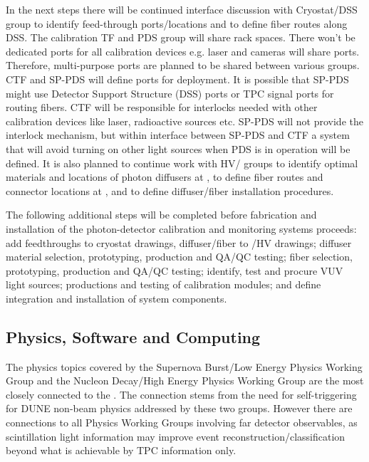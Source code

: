 In the next steps there will be continued interface discussion with Cryostat/DSS group to identify feed-through ports/locations and to define fiber routes along DSS. The calibration TF and PDS group will share rack spaces. There won't be dedicated ports for all calibration devices e.g. laser and cameras will share ports. 
Therefore, multi-purpose ports are planned to be shared between various groups. CTF and SP-PDS will define ports for deployment. It is possible that SP-PDS might use Detector Support Structure (DSS) ports or TPC signal ports for routing fibers. CTF will be responsible for interlocks needed with other calibration devices 
like laser, radioactive sources etc. SP-PDS will not provide the interlock mechanism, but within interface between SP-PDS and CTF a system that will avoid turning  on other light sources when PDS is in operation will be defined.
It is also planned to continue work with HV/ groups to identify optimal materials and locations of photon diffusers at , to define fiber routes and connector locations  at , and to define diffuser/fiber installation procedures.

The following additional steps will be completed before fabrication and installation of the photon-detector calibration and monitoring systems proceeds: add feedthroughs to cryostat drawings, diffuser/fiber to /HV drawings; diffuser material selection, prototyping, production and QA/QC testing; fiber selection, prototyping, production and QA/QC testing; identify, test and procure VUV light sources; productions and testing of calibration modules; and define integration and installation of system components.


\subsection{Physics, Software and Computing}


The physics topics covered by the Supernova Burst/Low Energy Physics Working Group and the Nucleon Decay/High Energy Physics Working Group are the most closely connected to the \single {}. The connection stems from the need for self-triggering for DUNE non-beam physics addressed by these two groups. 
However there are connections to all Physics Working Groups involving far detector observables, as scintillation light information may improve event reconstruction/classification beyond what is achievable by TPC information only. 

